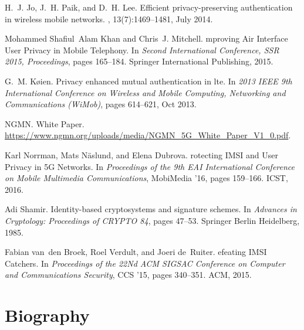 \documentclass{river-journal}
\begin{document}
\begin{thebibliography}{10}
H.~J. Jo, J.~H. Paik, and D.~H. Lee.
\newblock Efficient privacy-preserving authentication in wireless mobile
  networks.
, 13(7):1469--1481, July
  2014.

Mohammed Shafiul~Alam Khan and Chris~J. Mitchell.
mproving {A}ir {I}nterface {U}ser {P}rivacy in {M}obile
  {T}elephony.
\newblock In {\em Second International Conference, SSR 2015, Proceedings},
  pages 165--184. Springer International Publishing, 2015.

G.~M. K{\o}ien.
\newblock Privacy enhanced mutual authentication in lte.
\newblock In {\em 2013 IEEE 9th International Conference on Wireless and Mobile
  Computing, Networking and Communications (WiMob)}, pages 614--621, Oct 2013.

NGMN.
 {W}hite {P}aper.
\newblock
  \url{https://www.ngmn.org/uploads/media/NGMN_5G_White_Paper_V1_0.pdf}.

Karl Norrman, Mats N\"{a}slund, and Elena Dubrova.
rotecting {IMSI} and {U}ser {P}rivacy in {5G} {N}etworks.
\newblock In {\em Proceedings of the 9th EAI International Conference on Mobile
  Multimedia Communications}, MobiMedia '16, pages 159--166. ICST, 2016.

Adi Shamir.
\newblock Identity-based cryptosystems and signature schemes.
\newblock In {\em Advances in Cryptology: Proceedings of CRYPTO 84}, pages
  47--53. Springer Berlin Heidelberg, 1985.

Fabian van~den Broek, Roel Verdult, and Joeri de~Ruiter.
efeating {IMSI} {C}atchers.
\newblock In {\em Proceedings of the 22Nd ACM SIGSAC Conference on Computer and
  Communications Security}, CCS '15, pages 340--351. ACM, 2015.

\end{thebibliography}



\section*{Biography}

\end{document}
